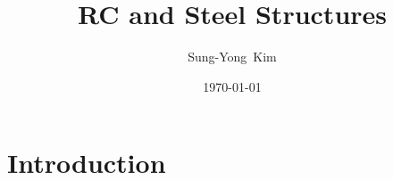 \documentclass[9pt]{beamer}
\title{RC and Steel Structures}
\author{Sung-Yong~Kim\inst{1}}
\institute[Changwon National University] %
{
	\inst{1}%
	Associate Professor, School of Architecture\\
	Changwon National University}
\date{\today}
\begin{document}
\begin{frame}
	\titlepage
\end{frame}

\section{Introduction}

\begin{frame}

\end{frame}
\end{document}
